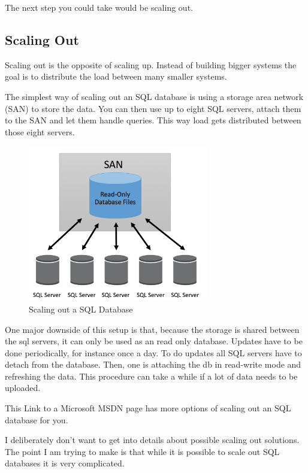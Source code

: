 \documentclass[12pt, numbers=noenddot]{scrreprt} %
\begin{document}
The next step you could take would be scaling out.

\subsection{Scaling Out}
Scaling out is the opposite of scaling up. Instead of building bigger systems the goal is to distribute the load between many smaller systems.

The simplest way of scaling out an SQL database is using a storage area network (SAN) to store the data. You can then use up to eight SQL servers, attach them to the SAN and let them handle queries. This way load gets distributed between those eight servers.

\begin{figure}[htbp]
  \centering
     \includegraphics[width=0.7\textwidth]{images/SQL-Scaling-Out}
  \caption{Scaling out a SQL Database}
  \label{fig:Bild1}
\end{figure}

One major downside of this setup is that, because the storage is shared between the sql servers, it can only be used as an read only database. Updates have to be done periodically, for instance once a day. To do updates all SQL servers have to detach from the database. Then, one is attaching the db in read-write mode and refreshing the data. This procedure can take a while if a lot of data needs to be uploaded.

This Link to a Microsoft MSDN page has more options of scaling out an SQL database for you.

I deliberately don’t want to get into details about possible scaling out solutions. The point I am trying to make is that while it is possible to scale out SQL databases it is very complicated.
\end{document}
